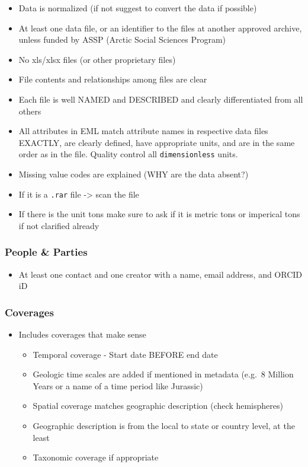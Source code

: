 \documentclass[
  letterpaper,
  DIV=11,
  numbers=noendperiod]{scrreprt}
\providecommand{\tightlist}{%
  \setlength{\itemsep}{0pt}\setlength{\parskip}{0pt}}\usepackage{longtable,booktabs,array}
\begin{document}
\begin{itemize}
\tightlist
\item
  Data is normalized (if not suggest to convert the data if possible)
\item
  At least one data file, or an identifier to the files at another
  approved archive, unless funded by ASSP (Arctic Social Sciences
  Program)
\item
  No xls/xlsx files (or other proprietary files)
\item
  File contents and relationships among files are clear
\item
  Each file is well NAMED and DESCRIBED and clearly differentiated from
  all others
\item
  All attributes in EML match attribute names in respective data files
  EXACTLY, are clearly defined, have appropriate units, and are in the
  same order as in the file. Quality control all \texttt{dimensionless}
  units.
\item
  Missing value codes are explained (WHY are the data absent?)
\item
  If it is a \texttt{.rar} file -\textgreater{} scan the file
\item
  If there is the unit tons make sure to ask if it is metric tons or
  imperical tons if not clarified already
\end{itemize}

\hypertarget{people-parties}{%
\subsubsection{People \& Parties}\label{people-parties}}

\begin{itemize}
\tightlist
\item
  At least one contact and one creator with a name, email address, and
  ORCID iD
\end{itemize}

\hypertarget{coverages}{%
\subsubsection{Coverages}\label{coverages}}

\begin{itemize}
\tightlist
\item
  Includes coverages that make sense

  \begin{itemize}
  \tightlist
  \item
    Temporal coverage - Start date BEFORE end date
  \item
    Geologic time scales are added if mentioned in metadata (e.g.~8
    Million Years or a name of a time period like Jurassic)
  \item
    Spatial coverage matches geographic description (check hemispheres)
  \item
    Geographic description is from the local to state or country level,
    at the least
  \item
    Taxonomic coverage if appropriate
  \end{itemize}
\end{itemize}
\end{document}
